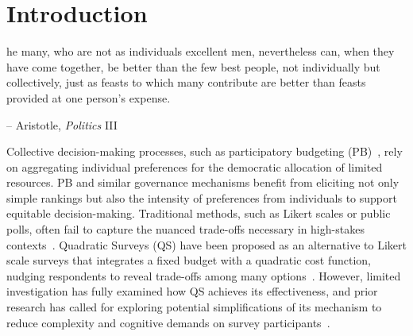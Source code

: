 \section{Introduction}

\begin{displayquote}
[T]he many, who are not as individuals excellent men, nevertheless can, when they have come together, be better than the few best people, not individually but collectively, just as feasts to which many contribute are better than feasts provided at one person's expense.

\begin{flushright}
-- Aristotle, \textit{Politics} III
\end{flushright}
\end{displayquote}

Collective decision-making processes, such as participatory budgeting (PB)~\cite{desousasantosParticipatoryBudgetingPorto1998}, rely on aggregating individual preferences for the democratic allocation of limited resources. PB and similar governance mechanisms benefit from eliciting not only simple rankings but also the intensity of preferences from individuals to support equitable decision-making. Traditional methods, such as Likert scales or public polls, often fail to capture the nuanced trade-offs necessary in high-stakes contexts~\cite{quarfoot2017quadratic,posner2017quadratic, krosnick1999survey}. Quadratic Surveys (QS) have been proposed as an alternative to Likert scale surveys that integrates a fixed budget with a quadratic cost function, nudging respondents to reveal trade-offs among many options~\cite{chengCanShowWhat2021, quarfoot2017quadratic, cavaille2024cares}. However, limited investigation has fully examined how QS achieves its effectiveness, and prior research has called for exploring potential simplifications of its mechanism to reduce complexity and cognitive demands on survey participants~\cite{cavaille2024cares, chengOrganizeThenVote2025}.


